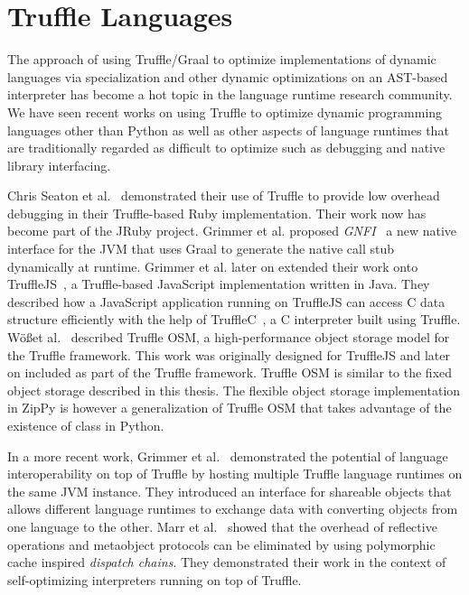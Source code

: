 \section{Truffle Languages}

The approach of using Truffle/Graal to optimize implementations of dynamic languages via specialization and other dynamic optimizations on an AST-based interpreter has become a hot topic in the language runtime research community.
We have seen recent works on using Truffle to optimize dynamic programming languages other than Python as well as other aspects of language runtimes that are traditionally regarded as difficult to optimize such as debugging and native library interfacing.

Chris Seaton et al.~\cite{seaton2014debugging} demonstrated their use of Truffle to provide low overhead debugging in their Truffle-based Ruby implementation.
Their work now has become part of the JRuby project.
Grimmer et al. proposed \emph{GNFI}~\cite{Grimmer+2013} a new native interface for the JVM that uses Graal to generate the native call stub dynamically at runtime.
Grimmer et al. later on extended their work onto TruffleJS~\cite{Grimmer+2014}, a Truffle-based JavaScript implementation written in Java.
They described how a JavaScript application running on TruffleJS can access C data structure efficiently with the help of TruffleC~\cite{Grimmer+2014TruffleC}, a C interpreter built using Truffle.
W\"{o}\ss et al.~\cite{WoB+2014} described Truffle OSM, a high-performance object storage model for the Truffle framework.
This work was originally designed for TruffleJS and later on included as part of the Truffle framework.
Truffle OSM is similar to the fixed object storage described in this thesis.
The flexible object storage implementation in ZipPy is however a generalization of Truffle OSM that takes advantage of the existence of class in Python.

In a more recent work, Grimmer et al.~\cite{grimmer2015dynamically, Grimmer+2014interoperability} demonstrated the potential of language interoperability on top of Truffle by hosting multiple Truffle language runtimes on the same JVM instance.
They introduced an interface for shareable objects that allows different language runtimes to exchange data with converting objects from one language to the other.
Marr et al.~\cite{marrzero} showed that the overhead of reflective operations and metaobject protocols can be eliminated by using polymorphic cache inspired \emph{dispatch chains}.
They demonstrated their work in the context of self-optimizing interpreters running on top of Truffle.

